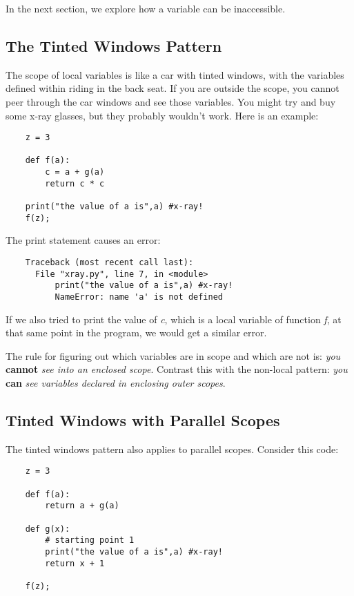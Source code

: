 In the next section, we explore how a variable can be
inaccessible.

\subsection{The Tinted Windows Pattern}

The scope of local variables is like a car with tinted
windows, with the variables defined within riding in
the back seat.
If you are outside the scope, you cannot
peer through the car windows  and see those variables.
You might try and buy some x-ray glasses, but they
probably wouldn't work.
Here is an example:

\begin{verbatim}
    z = 3

    def f(a):
        c = a + g(a)
        return c * c

    print("the value of a is",a) #x-ray!
    f(z);
\end{verbatim}

The print statement causes an error:

\begin{verbatim}
    Traceback (most recent call last):
      File "xray.py", line 7, in <module>
          print("the value of a is",a) #x-ray!
          NameError: name 'a' is not defined
\end{verbatim}

If we also tried to print the value of {\it c},
which is a local variable of function {\it f}, at that
same point in the program, we would get a similar error.

The rule for figuring out which variables are in scope and
which are not is:
{\it you} {\bf cannot} {\it see into an enclosed scope}.
Contrast this with the non-local pattern:
{\it you} {\bf can} {\it see variables
declared in enclosing outer scopes}.

\subsection{Tinted Windows with Parallel Scopes}

The tinted windows pattern also applies to parallel scopes.
Consider this code:

\begin{verbatim}
    z = 3

    def f(a):
        return a + g(a)

    def g(x):
        # starting point 1
        print("the value of a is",a) #x-ray!
        return x + 1

    f(z);
\end{verbatim}

